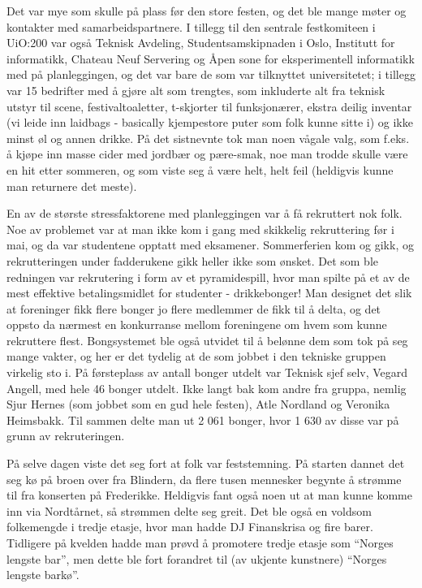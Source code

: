 Det var mye som skulle på plass før den store festen, og det ble mange møter og kontakter med samarbeidspartnere. I tillegg til den sentrale festkomiteen i UiO:200 var også Teknisk Avdeling, Studentsamskipnaden i Oslo, Institutt for informatikk, Chateau Neuf Servering og Åpen sone for eksperimentell informatikk med på planleggingen, og det var bare de som var tilknyttet universitetet; i tillegg var 15 bedrifter med å gjøre alt som trengtes, som inkluderte alt fra teknisk utstyr til scene, festivaltoaletter, t-skjorter til funksjonærer, ekstra deilig inventar (vi leide inn laidbags - basically kjempestore puter som folk kunne sitte i) og ikke minst øl og annen drikke. På det sistnevnte tok man noen vågale valg, som f.eks. å kjøpe inn masse cider med jordbær og pære-smak, noe man trodde skulle være en hit etter sommeren, og som viste seg å være helt, helt feil (heldigvis kunne man returnere det meste).

En av de største stressfaktorene med planleggingen var å få rekruttert nok folk. Noe av problemet var at man ikke kom i gang med skikkelig rekruttering før i mai, og da var studentene opptatt med eksamener. Sommerferien kom og gikk, og rekrutteringen under fadderukene gikk heller ikke som ønsket. Det som ble redningen var rekrutering i form av et pyramidespill, hvor man spilte på et av de mest effektive betalingsmidlet for studenter - drikkebonger! Man designet det slik at foreninger fikk flere bonger jo flere medlemmer de fikk til å delta, og det oppsto da nærmest en konkurranse mellom foreningene om hvem som kunne rekruttere flest. Bongsystemet ble også utvidet til å belønne dem som tok på seg mange vakter, og her er det tydelig at de som jobbet i den tekniske gruppen virkelig sto i. På førsteplass av antall bonger utdelt var Teknisk sjef selv, Vegard Angell, med hele 46 bonger utdelt. Ikke langt bak kom andre fra gruppa, nemlig Sjur Hernes (som jobbet som en gud hele festen), Atle Nordland og Veronika Heimsbakk. Til sammen delte man ut 2 061 bonger, hvor 1 630 av disse var på grunn av rekruteringen.

På selve dagen viste det seg fort at folk var feststemning. På starten dannet det seg kø på broen over fra Blindern, da flere tusen mennesker begynte å strømme til fra konserten på Frederikke. Heldigvis fant også noen ut at man kunne komme inn via Nordtårnet, så strømmen delte seg greit. Det ble også en voldsom folkemengde i tredje etasje, hvor man hadde DJ Finanskrisa og fire barer. Tidligere på kvelden hadde man prøvd å promotere tredje etasje som ``Norges lengste bar'', men dette ble fort forandret til (av ukjente kunstnere) ``Norges lengste barkø''.

